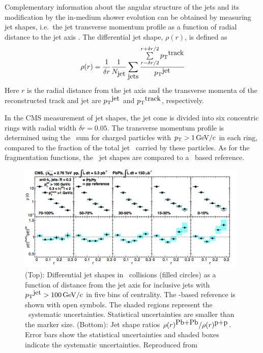 Complementary information about the angular structure of the jets and its modification
by the in-medium shower evolution can be obtained by measuring jet shapes, i.e.\ the
jet transverse momentum profile as a function of radial distance to the jet axis
\cite{MehtarTani:2010ma,Idilbi:2008vm,CasalderreySolana:2011rz,CasalderreySolana:2011rq,Neufeld:2011yh,Blaizot:2012fh,Fickinger:2013xwa}.
The differential jet shape, $\rho(r)$, is defined as
\begin{equation}
\rho(r) = \frac{1}{\delta r} \frac{1}{N_{\mbox{jet}}} \sum_{\mbox{jets}}
\frac{\sum\limits_{{r - \delta r/2}}^{{r + \delta r/2}}{\mbox{$p_{\mathrm{T}}$}^{\mbox{track}}}}{\mbox{$p_{\mathrm{T}}$}^{\mbox{jet}}}
\label{eq:rho(r)}
\end{equation}
Here $r$ is the radial distance from the jet axis
and the transverse momenta of the reconstructed track and jet are
$\mbox{$p_{\mathrm{T}}$}^{\mbox{jet}}$ and $\mbox{$p_{\mathrm{T}}$}^{\mbox{track}}$, respectively.

In the CMS measurement of jet shapes\cite{Chatrchyan:2013kwa}, the jet cone is divided into six concentric rings
with radial width $\delta r = 0.05$. The transverse momentum profile is determined using
the \pT\ sum for charged particles with $\mbox{$p_{\mathrm{T}}$} > 1\,\mathrm{GeV/c}$ in each ring, compared to
the fraction of the total jet \pT\ carried by these particles. As for the fragmentation
functions, the \PbPb\ jet shapes are compared to a \pp\ based reference.

\begin{figure}[!ht]
\begin{center}
\includegraphics[width=0.98\textwidth]{jetfigures/JetShapes_GR.png}
\caption{\label{fig:JSRatio}
(Top): Differential jet shapes in \PbPb\ collisions (filled circles)
as a function of distance from the jet axis for inclusive jets with $\mbox{$p_{\mathrm{T}}$}^{\mbox{jet}} >100\,\mathrm{GeV/c}$
in five bins of centrality.  The \pp-based reference is shown with open symbols.
The shaded regions represent the \PbPb\ systematic uncertainties.
Statistical uncertainties are smaller than the marker size.
(Bottom): Jet shape ratios $\rho(r)^{\mbox{Pb+Pb}}/\rho(r)^{\mbox{p+p}}$.
Error bars show the statistical uncertainties and shaded boxes indicate the systematic uncertainties. 
Reproduced from~\cite{Chatrchyan:2013kwa}}
\label{fig:GR:CMS_jetshapes}
\end{center}
\end{figure}

